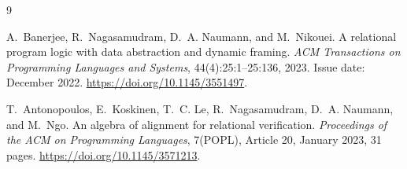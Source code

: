\documentclass[11pt]{article}
\begin{document}
\begin{thebibliography}{9}

A.~Banerjee, R.~Nagasamudram, D.~A. Naumann, and M.~Nikouei.
\newblock A relational program logic with data abstraction and dynamic framing.
\newblock \emph{ACM Transactions on Programming Languages and Systems}, 44(4):25:1--25:136, 2023.
\newblock Issue date: December 2022.
\newblock \url{https://doi.org/10.1145/3551497}.

T.~Antonopoulos, E.~Koskinen, T.~C. Le, R.~Nagasamudram, D.~A. Naumann, and M.~Ngo.
\newblock An algebra of alignment for relational verification.
\newblock \emph{Proceedings of the ACM on Programming Languages}, 7(POPL), Article 20, January 2023, 31 pages.
\newblock \url{https://doi.org/10.1145/3571213}.







\end{thebibliography}
\end{document}
